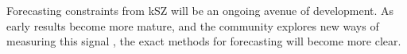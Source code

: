 Forecasting constraints from kSZ will be an ongoing avenue of development. As early results become
more mature, and the community explores new ways of measuring this signal 
\cite{Hand:2012ui,Keisler:2012eg,Ade:2015lza,Schaan:2015uaa,Hill:2016dta,Soergel:2016mce}, the exact methods for forecasting
will become more clear.












